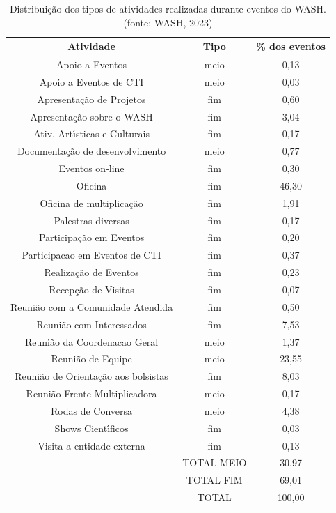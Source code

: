 \documentclass[
12pt,		%
openright,	%
twoside,  %
a4paper,			%
chapter=TITLE,		%
english,			%
french,				%
spanish,			%
brazil				%
]{USPSC-classe/USPSC}
\begin{document}
\begin{table}[htb]
\tiny
\caption{\label{a5eaff3e0d7afe3bcccdccd277cae286bd506174}Distribui\c{c}\~ao dos tipos de atividades realizadas durante eventos do WASH. (fonte: WASH, 2023)}

\centering
\begin{tabular}{|c|c|c|}
\hline
Atividade  &  Tipo  &  \% dos eventos \\
\hline
Apoio a Eventos  &  meio  &  0,13 \\
Apoio a Eventos de CTI  &  meio  &  0,03 \\
Apresenta\c{c}\~ao de Projetos  &  fim  &  0,60 \\
Apresenta\c{c}\~ao sobre o WASH  &  fim  &  3,04 \\
Ativ. Art\'{\i}sticas e Culturais  &  fim  &  0,17 \\
Documenta\c{c}\~ao de desenvolvimento  &  meio  &  0,77 \\
Eventos on-line  &  fim  &  0,30 \\
Oficina  &  fim  &  46,30 \\
Oficina de multiplica\c{c}\~ao  &  fim  &  1,91 \\
Palestras diversas  &  fim  &  0,17 \\
Participa\c{c}\~ao em Eventos  &  fim  &  0,20 \\
Participacao em Eventos de CTI  &  fim  &  0,37 \\
Realiza\c{c}\~ao de Eventos  &  fim  &  0,23 \\
Recep\c{c}\~ao de Visitas  &  fim  &  0,07 \\
Reuni\~ao com a Comunidade Atendida  &  fim  &  0,50 \\
Reuni\~ao com Interessados  &  fim  &  7,53 \\
Reuni\~ao da Coordenacao Geral  &  meio  &  1,37 \\
Reuni\~ao de Equipe  &  meio  &  23,55 \\
Reuni\~ao de Orienta\c{c}\~ao aos bolsistas  &  fim  &  8,03 \\
Reuni\~ao Frente Multiplicadora  &  meio  &  0,17 \\
Rodas de Conversa  &  meio  &  4,38 \\
Shows Cient\'{\i}ficos  &  fim  &  0,03 \\
Visita a entidade externa  &  fim  &  0,13 \\
\hline
  &  TOTAL MEIO  &  30,97 \\
  &  TOTAL FIM  &  69,01  \\
  &  TOTAL  &  100,00 \\
\hline
\end{tabular}
\end{table}
\end{document}
